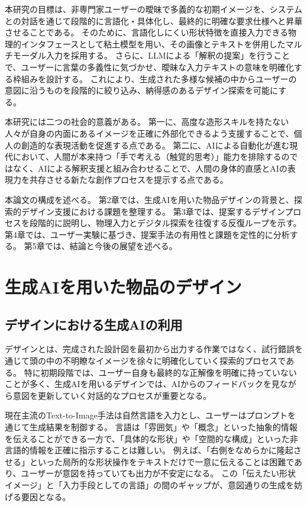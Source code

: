 \documentclass{kuisthesis}
\begin{document}
本研究の目標は、非専門家ユーザーの曖昧で多義的な初期イメージを、システムとの対話を通じて段階的に言語化・具体化し、最終的に明確な要求仕様へと昇華させることである。
そのために、言語化しにくい形状特徴を直接入力できる物理的インタフェースとして粘土模型を用い、その画像とテキストを併用したマルチモーダル入力を採用する。
さらに、LLMによる「解釈の提案」を行うことで、ユーザーに言葉の多義性に気づかせ、曖昧な入力テキストの意味を明確化する枠組みを設計する。
これにより、生成された多様な候補の中からユーザーの意図に沿うものを段階的に絞り込み、納得感のあるデザイン探索を可能にする。

本研究には二つの社会的意義がある。
第一に、高度な造形スキルを持たない人々が自身の内面にあるイメージを正確に外部化できるよう支援することで、個人の創造的な表現活動を促進する点である。
第二に、AIによる自動化が進む現代において、人間が本来持つ「手で考える（触覚的思考）」能力を排除するのではなく、AIによる解釈支援と組み合わせることで、人間の身体的直感とAIの表現力を共存させる新たな創作プロセスを提示する点である。

本論文の構成を述べる。
第2章では、生成AIを用いた物品デザインの背景と、探索的デザイン支援における課題を整理する。
第3章では、提案するデザインプロセスを段階的に説明し、物理入力とデジタル探索を往復する反復ループを示す。
第4章では、ユーザー実験に基づき、提案手法の有用性と課題を定性的に分析する。
第5章では、結論と今後の展望を述べる。



\section{生成AIを用いた物品のデザイン}
\subsection{デザインにおける生成AIの利用}
デザインとは、完成された設計図を最初から出力する作業ではなく、試行錯誤を通じて頭の中の不明瞭なイメージを徐々に明確化していく探索的プロセスである。
特に初期段階では、ユーザー自身も最終的な正解像を明確に持っていないことが多く、生成AIを用いるデザインでは、AIからのフィードバックを見ながら意図を更新していく対話的なプロセスが重要となる。

現在主流のText-to-Image手法は自然言語を入力とし、ユーザーはプロンプトを通じて生成結果を制御する。
言語は「雰囲気」や「概念」といった抽象的情報を伝えることができる一方で、「具体的な形状」や「空間的な構成」といった非言語的情報を正確に指示することは難しい。
例えば、「右側をなめらかに隆起させる」といった局所的な形状操作をテキストだけで一意に伝えることは困難であり、ユーザーが意図を持っていても出力が不安定になる。
この「伝えたい形状イメージ」と「入力手段としての言語」の間のギャップが、意図通りの生成を妨げる要因となる。
\end{document}
